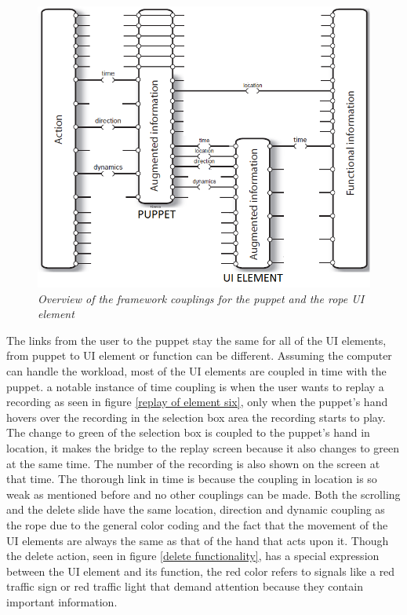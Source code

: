 \begin{figure}[H]
	\begin{center}
		\includegraphics[width=14cm]{figures/standard_framework_Rope.png}
		\caption{\emph{Overview of the framework couplings for the puppet and the rope UI element}}
		\label{puppet_rope_framework}
	\end{center}
\end{figure}

The links from the user to the puppet stay the same for all of the UI elements, from puppet to UI element or function can be different. Assuming the computer can handle the workload, most of the UI elements are coupled in time with the puppet. a notable instance of time coupling is when the user wants to replay a recording as seen in figure \ref{replay of element six}, only when the puppet's hand hovers over the recording in the selection box area the recording starts to play. The change to green of the selection box is coupled to the puppet's hand in location, it makes the bridge to the replay screen because it also changes to green at the same time. The number of the recording is also shown on the screen at that time. The thorough link in time is because the coupling in location is so weak as mentioned before and no other couplings can be made. Both the scrolling and the delete slide have the same location, direction and dynamic coupling as the rope due to the general color coding and the fact that the movement of the UI elements are always the same as that of the hand that acts upon it. Though the delete action, seen in figure \ref{delete functionality}, has a special expression between the UI element and its function, the red color refers to signals like a red traffic sign or red traffic light that demand attention because they contain important information. 

